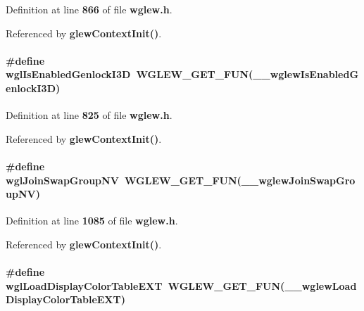 Definition at line {\bf 866} of file {\bf wglew.\+h}.



Referenced by {\bf glew\+Context\+Init()}.

\paragraph[{wgl\+Is\+Enabled\+Genlock\+I3D}]{\setlength{\rightskip}{0pt plus 5cm}\#define wgl\+Is\+Enabled\+Genlock\+I3D~{\bf W\+G\+L\+E\+W\+\_\+\+G\+E\+T\+\_\+\+F\+UN}({\bf \+\_\+\+\_\+wglew\+Is\+Enabled\+Genlock\+I3D})}\label{wglew_8h_a4b48630978a2123dbbebad2360657c5d}


Definition at line {\bf 825} of file {\bf wglew.\+h}.



Referenced by {\bf glew\+Context\+Init()}.

\paragraph[{wgl\+Join\+Swap\+Group\+NV}]{\setlength{\rightskip}{0pt plus 5cm}\#define wgl\+Join\+Swap\+Group\+NV~{\bf W\+G\+L\+E\+W\+\_\+\+G\+E\+T\+\_\+\+F\+UN}({\bf \+\_\+\+\_\+wglew\+Join\+Swap\+Group\+NV})}\label{wglew_8h_af85d35a2241041170c1075c4965aa50a}


Definition at line {\bf 1085} of file {\bf wglew.\+h}.



Referenced by {\bf glew\+Context\+Init()}.

\paragraph[{wgl\+Load\+Display\+Color\+Table\+E\+XT}]{\setlength{\rightskip}{0pt plus 5cm}\#define wgl\+Load\+Display\+Color\+Table\+E\+XT~{\bf W\+G\+L\+E\+W\+\_\+\+G\+E\+T\+\_\+\+F\+UN}({\bf \+\_\+\+\_\+wglew\+Load\+Display\+Color\+Table\+E\+XT})}\label{wglew_8h_aade14e36974d80d3843c2ad5e549a074}


